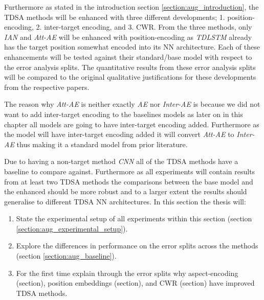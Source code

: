 Furthermore as stated in the introduction section \ref{section:aug_introduction}, the TDSA methods will be enhanced with three different developments; 1. position-encoding, 2. inter-target encoding, and 3. CWR. From the three methods, only \textit{IAN} and \textit{Att-AE} will be enhanced with position-encoding as \textit{TDLSTM} already has the target position somewhat encoded into its NN architecture. Each of these enhancements will be tested against their standard/base model with respect to the error analysis splits. The quantitative results from these error analysis splits will be compared to the original qualitative justifications for these developments from the respective papers.

The reason why \textit{Att-AE} is neither exactly \textit{AE} \citep{wang-etal-2016-attention} nor \textit{Inter-AE} \citep{hazarika-etal-2018-modeling} is because we did not want to add inter-target encoding to the baselines models as later on in this chapter all models are going to have inter-target encoding added. Furthermore as the model will have inter-target encoding added it will convert \textit{Att-AE} to \textit{Inter-AE} thus making it a standard model from prior literature.

Due to having a non-target method \textit{CNN} all of the TDSA methods have a baseline to compare against. Furthermore as all experiments will contain results from at least two TDSA methods the comparisons between the base model and the enhanced should be more robust and to a larger extent the results should generalise to different TDSA NN architectures. In this section the thesis will:
\begin{enumerate}
    \item State the experimental setup of all experiments within this section (section \ref{section:aug_experimental_setup}).
    \item Explore the differences in performance on the error splits across the methods (section \ref{section:aug_baseline}).
    \item For the first time explain through the error splits why aspect-encoding (section), position embeddings (section), and CWR (section) have improved TDSA methods.
\end{enumerate}

